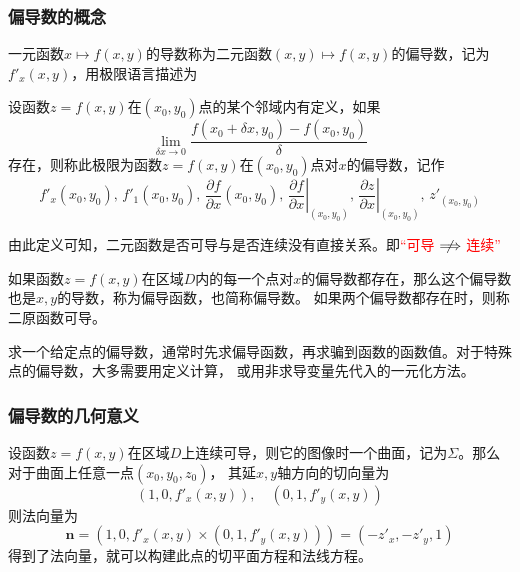 \subsubsection{偏导数的概念}
一元函数$x\mapsto f(x,y)$的导数称为二元函数$(x,y)\mapsto f(x,y)$的偏导数，记为$f'_x(x,y)$，用极限语言描述为
\begin{definition}
    设函数$z=f(x,y)$在$(x_0,y_0)$点的某个邻域内有定义，如果
    \[ \lim_{\delta x\to 0} \frac{f(x_0+\delta x,y_0)-f(x_0,y_0)}{\delta} \]
    存在，则称此极限为函数$z=f(x,y)$在$(x_0,y_0)$点对$x$的偏导数，记作
    \[
        f'_x(x_0,y_0),\,
        f'_1(x_0,y_0),\,
        \frac{\partial f}{\partial x}(x_0,y_0),\,
        \left.\frac{\partial f}{\partial x}\right|_{(x_0,y_0)},\,
        \left.\frac{\partial z}{\partial x}\right|_{(x_0,y_0)},\,
        z'_{(x_0,y_0)}
    \]
\end{definition}

由此定义可知，二元函数是否可导与是否连续没有直接关系。即\textcolor{red}{“可导$\centernot\implies$连续”}

如果函数$z=f(x,y)$在区域$D$内的每一个点对$x$的偏导数都存在，那么这个偏导数也是$x,y$的导数，称为偏导函数，也简称偏导数。
如果两个偏导数都存在时，则称二原函数可导。

\begin{situation}
    求一个给定点的偏导数，通常时先求偏导函数，再求骗到函数的函数值。对于特殊点的偏导数，大多需要用定义计算，
    或用非求导变量先代入的一元化方法。
\end{situation}

\subsubsection{偏导数的几何意义}
设函数$z=f(x,y)$在区域$D$上连续可导，则它的图像时一个曲面，记为$\Sigma$。那么对于曲面上任意一点$(x_0,y_0,z_0)$，
其延$x,y$轴方向的切向量为
\[ (1,0,f'_x(x,y)),\quad(0,1,f'_y(x,y)) \]
则法向量为
\begin{equation}
    \bm{n} = (1,0,f'_x(x,y)\times(0,1,f'_y(x,y))) = (-z'_x, -z'_y, 1)
\end{equation}
得到了法向量，就可以构建此点的切平面方程和法线方程。


